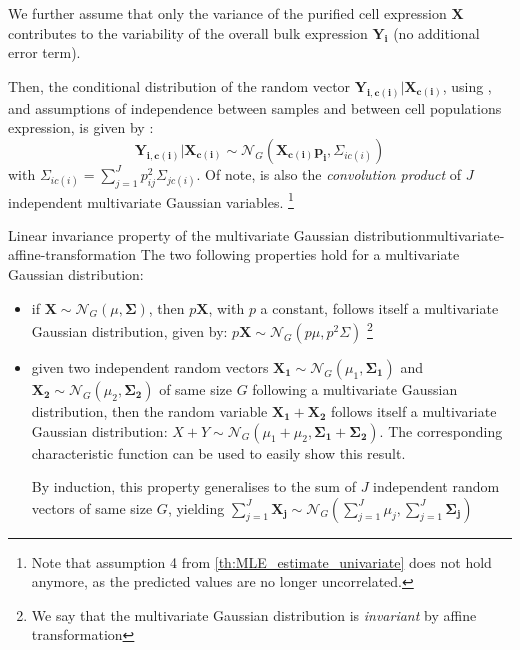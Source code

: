 We further assume that only the variance of the purified cell expression $\boldsymbol{X}$ contributes to the variability of the overall bulk expression $\boldsymbol{Y_i}$ (no additional error term).

Then, the conditional distribution of the random vector $\boldsymbol{Y_{i, c(i)}}|\boldsymbol{X_{c(i)}}$, using , and assumptions of independence between samples and between cell populations expression, is given by :
\begin{equation}
\label{eq:11}
   \boldsymbol{Y_{i, c(i)}}|\boldsymbol{X_{c(i)}} \sim \mathcal{N}_G(\boldsymbol{X_{c(i)}} \boldsymbol{p_i}, \Sigma_{ic(i)})
\end{equation}
with $\Sigma_{ic(i)}=\sum_{j=1}^J p_{ij}^2\Sigma_{jc(i)}$. Of note,  is also the \textit{convolution product} of $J$ independent multivariate Gaussian variables. \footnote{Note that assumption 4 from \ref{th:MLE_estimate_univariate} does not hold anymore, as the predicted values are no longer uncorrelated.}


\begin{Property}{Linear invariance property of the multivariate Gaussian distribution}{multivariate-affine-transformation}
The two following properties hold for a multivariate Gaussian distribution:
\begin{itemize}
    \item if $\boldsymbol{X} \sim \mathcal{N}_G( \mu, \boldsymbol{\Sigma})$, then $p\boldsymbol{X}$, with $p$ a constant, follows itself a multivariate Gaussian distribution, given by:
    $p\boldsymbol{X} \sim \mathcal{N}_G (p \mu, p^2 \Sigma)$ \footnote{We say that the multivariate Gaussian distribution is \textit{invariant} by affine transformation}
    
    \item given two independent random vectors $\boldsymbol{X_1} \sim \mathcal{N}_G(\mu_1, \boldsymbol{\Sigma_1})$ and  $\boldsymbol{X_2} \sim \mathcal{N}_G(\mu_2, \boldsymbol{\Sigma_2})$ of same size $G$ following a multivariate Gaussian distribution, then the random variable $\boldsymbol{X_1} + \boldsymbol{X_2}$ follows itself a multivariate Gaussian distribution: $X + Y \sim \mathcal{N}_G (\mu_1 + \mu_2, \boldsymbol{\Sigma_1} + \boldsymbol{\Sigma_2})$. The corresponding characteristic function can be used to easily show this result.
    
    By induction, this property generalises to the sum of $J$ independent random vectors of same size $G$, yielding $\sum_{j=1}^J \boldsymbol{X_j} \sim \mathcal{N}_G(\sum_{j=1}^J \mu_j, \sum_{j=1}^J \boldsymbol{\Sigma_j})$
\end{itemize}
\end{Property}

